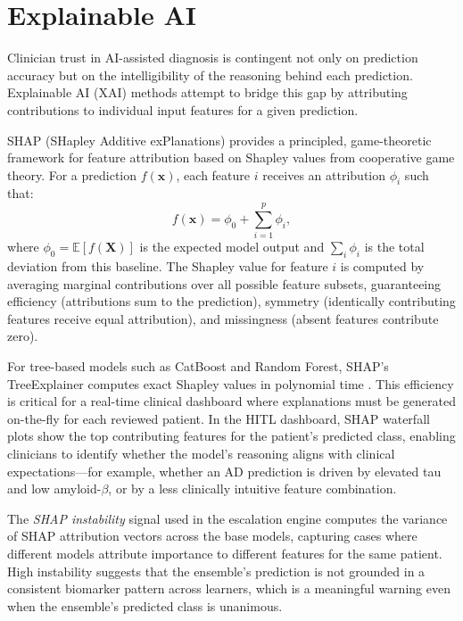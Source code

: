 \documentclass[12pt, a4paper]{report}
\begin{document}
  \section{Explainable AI}
  \label{sec:xai}

  Clinician trust in AI-assisted diagnosis is contingent not only on prediction
  accuracy but on the intelligibility of the reasoning behind each prediction.
  Explainable AI (XAI) methods attempt to bridge this gap by attributing contributions
  to individual input features for a given prediction.

  SHAP (SHapley Additive exPlanations) \citep{lundberg2017shap} provides a
  principled, game-theoretic framework for feature attribution based on Shapley values
  from cooperative game theory. For a prediction $f(\mathbf{x})$, each feature $i$
  receives an attribution $\phi_i$ such that:
  \begin{equation}
    f(\mathbf{x}) = \phi_0 + \sum_{i=1}^{p} \phi_i,
    \label{eq:shap}
  \end{equation}
  where $\phi_0 = \mathbb{E}[f(\mathbf{X})]$ is the expected model output and
  $\sum_i \phi_i$ is the total deviation from this baseline. The Shapley value for
  feature $i$ is computed by averaging marginal contributions over all possible
  feature subsets, guaranteeing efficiency (attributions sum to the prediction),
  symmetry (identically contributing features receive equal attribution), and
  missingness (absent features contribute zero).

  For tree-based models such as CatBoost and Random Forest, SHAP's TreeExplainer
  computes exact Shapley values in polynomial time \citep{lundberg2017shap}. This
  efficiency is critical for a real-time clinical dashboard where explanations must be
  generated on-the-fly for each reviewed patient. In the HITL dashboard, SHAP
  waterfall plots show the top contributing features for the patient's predicted class,
  enabling clinicians to identify whether the model's reasoning aligns with clinical
  expectations---for example, whether an AD prediction is driven by elevated tau and
  low amyloid-$\beta$, or by a less clinically intuitive feature combination.

  The \emph{SHAP instability} signal used in the escalation engine computes the
  variance of SHAP attribution vectors across the base models, capturing cases where
  different models attribute importance to different features for the same patient.
  High instability suggests that the ensemble's prediction is not grounded in a
  consistent biomarker pattern across learners, which is a meaningful warning even
  when the ensemble's predicted class is unanimous.
\end{document}
